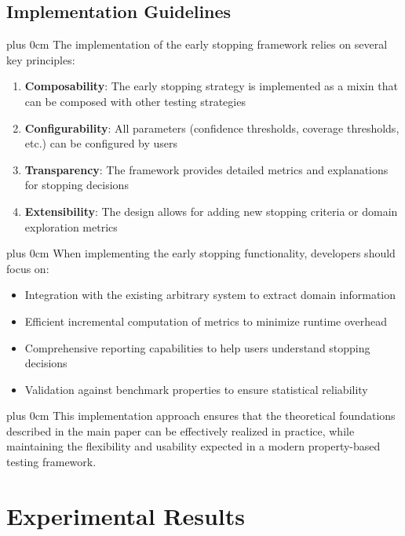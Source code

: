 \documentclass[11pt,a4paper]{article}
\newcommand{\justifytext}{\leftskip=0pt \rightskip=0pt plus 0cm}
\begin{document}
\subsection{Implementation Guidelines}

\justifytext
The implementation of the early stopping framework relies on several key principles:

\begin{tcolorbox}[
  colback=blue!5!white,
  colframe=blue!75!black,
  title=Implementation Principles,
  fonttitle=\bfseries
]
\begin{enumerate}
\item \textbf{Composability}: The early stopping strategy is implemented as a mixin that can be composed with other testing strategies
\item \textbf{Configurability}: All parameters (confidence thresholds, coverage thresholds, etc.) can be configured by users
\item \textbf{Transparency}: The framework provides detailed metrics and explanations for stopping decisions
\item \textbf{Extensibility}: The design allows for adding new stopping criteria or domain exploration metrics
\end{enumerate}
\end{tcolorbox}

\justifytext
When implementing the early stopping functionality, developers should focus on:

\begin{itemize}
\item Integration with the existing arbitrary system to extract domain information
\item Efficient incremental computation of metrics to minimize runtime overhead
\item Comprehensive reporting capabilities to help users understand stopping decisions
\item Validation against benchmark properties to ensure statistical reliability
\end{itemize}

\justifytext
This implementation approach ensures that the theoretical foundations described in the main paper can be effectively realized in practice, while maintaining the flexibility and usability expected in a modern property-based testing framework.

\section{Experimental Results}
\label{sec:experimental-results}
\end{document}
